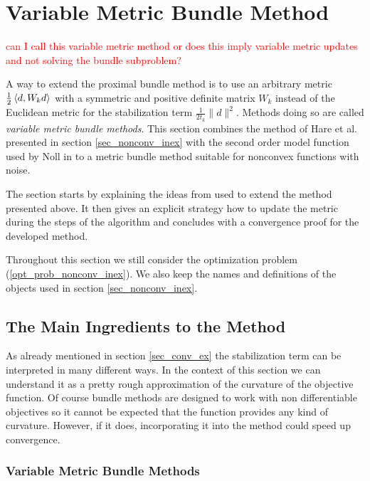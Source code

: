 \section{Variable Metric Bundle Method}
\label{sec_variable_metric}

\textcolor{red}{can I call this variable metric method or does this imply variable metric updates and not solving the bundle subproblem?}

A way to extend the proximal bundle method is to use an arbitrary metric \(\frac{1}{2}\left\langle d,W_kd \right\rangle\) with a symmetric and positive definite matrix \(W_k\) instead of the Euclidean metric for the stabilization term \(\frac{1}{2t_k}\|d\|^2\). Methods doing so are called \emph{variable metric bundle methods}.
This section combines the method of Hare et al. presented in section \ref{sec_nonconv_inex} with the second order model function used by Noll in \cite{Noll2013} to a metric bundle method suitable for nonconvex functions with noise.

The section starts by explaining the ideas from \cite{Noll2013} used to extend the method presented above. It then gives an explicit strategy how to update the metric during the steps of the algorithm and concludes with a convergence proof for the developed method.

Throughout this section we still consider the optimization problem (\ref{opt_prob_nonconv_inex}). We also keep the names and definitions of the objects used in section \ref{sec_nonconv_inex}.

\subsection{The Main Ingredients to the Method}

As already mentioned in section \ref{sec_conv_ex} the stabilization term can be interpreted in many different ways. In the context of this section we can understand it as a pretty rough approximation of the curvature of the objective function.
Of course bundle methods are designed to work with non differentiable objectives so it cannot be expected that the function provides any kind of curvature. However, if it does, incorporating it into the method could speed up convergence.

\subsubsection{Variable Metric Bundle Methods}

